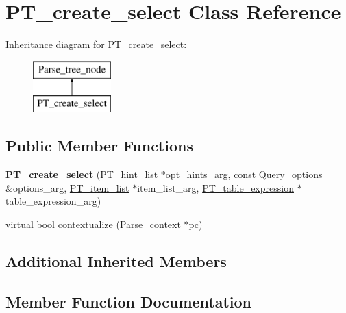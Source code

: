 \hypertarget{classPT__create__select}{}\section{P\+T\+\_\+create\+\_\+select Class Reference}
\label{classPT__create__select}
Inheritance diagram for P\+T\+\_\+create\+\_\+select\+:\begin{figure}[H]
\begin{center}
\leavevmode
\includegraphics[height=2.000000cm]{classPT__create__select}
\end{center}
\end{figure}
\subsection*{Public Member Functions}
\begin{DoxyCompactItemize}
\item 
\mbox{\label{classPT__create__select_a3cf5c002290e1cf29175896ab2fcfdae}} 
{\bfseries P\+T\+\_\+create\+\_\+select} (\mbox{\hyperlink{classPT__hint__list}{P\+T\+\_\+hint\+\_\+list}} $\ast$opt\+\_\+hints\+\_\+arg, const Query\+\_\+options \&options\+\_\+arg, \mbox{\hyperlink{classPT__item__list}{P\+T\+\_\+item\+\_\+list}} $\ast$item\+\_\+list\+\_\+arg, \mbox{\hyperlink{classPT__table__expression}{P\+T\+\_\+table\+\_\+expression}} $\ast$table\+\_\+expression\+\_\+arg)
\item 
virtual bool \mbox{\hyperlink{classPT__create__select_a1caf6147549443ad1d6578da94bd131f}{contextualize}} (\mbox{\hyperlink{structParse__context}{Parse\+\_\+context}} $\ast$pc)
\end{DoxyCompactItemize}
\subsection*{Additional Inherited Members}


\subsection{Member Function Documentation}
\mbox{\label{classPT__create__select_a1caf6147549443ad1d6578da94bd131f}} 
